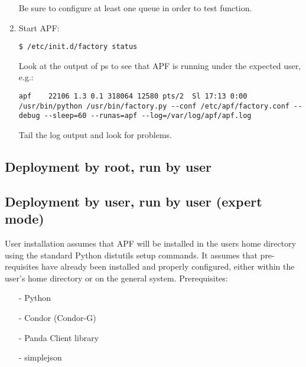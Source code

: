 \documentclass[a4paper]{jpconf}
\begin{document}
\begin{enumerate}
Be sure to configure at least one queue in order to test function.
\item Start APF:
\begin{verbatim}
$ /etc/init.d/factory status
\end{verbatim}
Look at the output of ps to see that APF is running under the expected user, e.g.:
\begin{verbatim}
apf    22106 1.3 0.1 318064 12580 pts/2  Sl 17:13 0:00 /usr/bin/python /usr/bin/factory.py --conf /etc/apf/factory.conf --debug --sleep=60 --runas=apf --log=/var/log/apf/apf.log
\end{verbatim}
Tail the log output and look for problems.
\end{enumerate}

\subsection{Deployment by root, run by user}

\subsection{Deployment by user, run by user (expert mode)}

User installation assumes that APF will be installed in the users home directory using the standard Python distutils setup commands. 
It assumes that pre-requisites have already been installed and properly configured,
either within the user's home directory or on the general system.
Prerequisites: 

\begin{enumerate}
\item[-] Python 
\item[-] Condor (Condor-G) 
\item[-] Panda Client library 
\item[-] simplejson
\end{enumerate}

\end{document}
